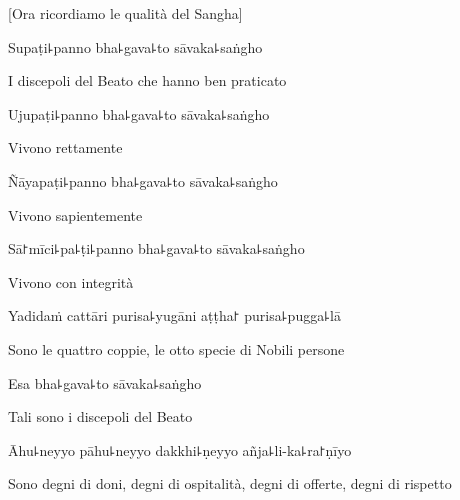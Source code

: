 \begin{english}
[Ora ricordiamo le qualità del Sangha]
\end{english}

Supaṭi꜕panno bha꜕gava꜕to sāvaka꜕saṅgho\\

\begin{english}
I discepoli del Beato che hanno ben praticato\\
\end{english}

Ujupaṭi꜕panno bha꜕gava꜕to sāvaka꜕saṅgho\\
\begin{english}
Vivono rettamente\\
\end{english}

Ñāyapaṭi꜕panno bha꜕gava꜕to sāvaka꜕saṅgho\\

\begin{english}
Vivono sapientemente\\
\end{english}

Sā꜓mīci꜕pa꜕ṭi꜕panno bha꜕gava꜕to sāvaka꜕saṅgho\\

\begin{english}
Vivono con integrità\\
\end{english}



Yadidaṁ cattāri purisa꜕yugāni aṭṭha꜓ purisa꜕pugga꜕lā\\
\begin{english}
Sono le quattro coppie, le otto specie di Nobili persone\\
\end{english}



Esa bha꜕gava꜕to sāvaka꜕saṅgho\\
\begin{english}
Tali sono i discepoli del Beato\\
\end{english}



Āhu꜕neyyo pāhu꜕neyyo dakkhi꜕ṇeyyo añja꜕li-ka꜕ra꜓ṇīyo\\
\begin{english}   
Sono degni di doni, degni di ospitalità, degni di offerte, degni di rispetto\\
\end{english}


